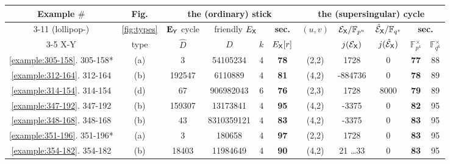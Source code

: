 \documentclass[version=preprint]{iacrcc}
\newcommand{\F}{\mathbb{F}}
\newcommand{\EC}{\mathcal{E}}
\begin{document}
\begin{table}[ht!] 
\centering
\small
\renewcommand{\tabcolsep}{0.1cm}
\renewcommand{\arraystretch}{1.2}
	\begin{tabular}{|c|c|c|c|c|c|c|c|c|c|c|}
\hline
		Example $\#$ 	&	Fig.			&	 	\multicolumn{4}{|c|}{the (ordinary) stick}				&	\multicolumn{5}{|c|}{the (supersingular) cycle}	\\
\cline{3-11}
(\textsf{lollipop-})			&	  \ref{fig:types}				& $\mathbf{E}_{\sf Y}$ cycle	&  \multicolumn{2}{|c|}{friendly $E_{\sf X}$}		& {\bf sec.}	& \multirow{ 2}{*}{$(u,v)$}	&	\multicolumn{1}{|c|}{${\EC}_{\sf X}/\F_{p^u}$}	&  $\hat{\EC}_{\sf X}/\F_{q^v}$	& \multicolumn{2}{|c|}{{\bf sec.} }	\\
\cline{3-5}\cline{8-11}
\textsf{X-Y}				&	type				& $\hat{D}$	 	& $D$	&    $k$ 	& $E_{\sf X}[r]$	& 	 &  $j(\EC_{\sf X})$ 	& $j(\hat{\EC}_{\sf X})$	&  $\F_{p^4}^\times$ & $\F_{q^6}^\times$ \\
\hline
\ref{example:305-158}. \textsf{305-158}*	&	(a)	&	3		&54105234	&	4	&	{\bf 78}	&	(2,2)	& 1728	& 0		& {\bf 77}	& 	88	\\
\ref{example:312-164}. \textsf{312-164} 	&	(b)	&192547		& 6110889	&	4	&	{\bf 81}	&	 (4,2)	& -884736	& 0		& {\bf 78}	&	89	\\
\ref{example:314-154}. \textsf{314-154}	&	(d)	&	67		&906982043&	6	&	{\bf 76}	&	(2,3)	&	1728	& 8000	& {\bf 79}	&	89	\\
\ref{example:347-192}. \textsf{347-192}	&	(b)	& 159307	&13173841 &	4	&	{\bf 95}		&	(4,2)	&	-3375	&0 			& {\bf 82}	&	95	\\
\ref{example:348-168}. \textsf{348-168}	&	(b)	&	43		&8310359121 &	4	&	{\bf 83}	&	(4,2)	&	-3375	& 0 		& {\bf 83}	&	95	\\
\ref{example:351-196}. \textsf{351-196}*	&	(a)	&	3		&180658	&	4	&	{\bf 97}	&	(2,2)	& 	1728	&  0		& {\bf 83}	&	95	\\
\ref{example:354-182}. \textsf{354-182}	&	(b)	&	18403	&11984649  &	4	 &	{\bf 90}	&	(4,2)	&	21 \dots 33	&	0 & {\bf 83}	&	95	\\

\end{tabular}
\end{table}
\end{document}
